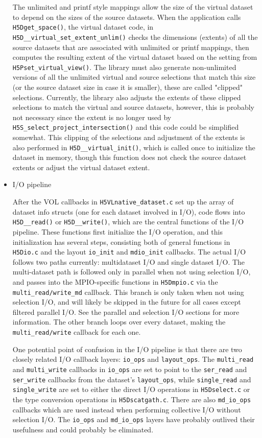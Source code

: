\begin{itemize}
The unlimited and printf style mappings allow the size of the virtual dataset to depend on the sizes of the source datasets. When the application calls \texttt{H5Dget\_space()}, the virtual dataset code, in \texttt{H5D\_\_virtual\_set\_extent\_unlim()} checks the dimensions (extents) of all the source datasets that are associated with unlimited or printf mappings, then computes the resulting extent of the virtual dataset based on the setting from \texttt{H5Pset\_virtual\_view()}. The library must also generate non-unlimited versions of all the unlimited virtual and source selections that match this size (or the source dataset size in case it is smaller), these are called "clipped" selections. Currently, the library also adjusts the extents of these clipped selections to match the virtual and source datasets, however, this is probably not necessary since the extent is no longer used by \texttt{H5S\_select\_project\_intersection()} and this code could be simplified somewhat. This clipping of the selections and adjustment of the extents is also performed in \texttt{H5D\_\_virtual\_init()}, which is called once to initialize the dataset in memory, though this function does not check the source dataset extents or adjust the virtual dataset extent.

    \item I/O pipeline

After the VOL callbacks in \texttt{H5VLnative\_dataset.c} set up the array of dataset info structs (one for each dataset involved in I/O), code flows into \texttt{H5D\_\_read()} or \texttt{H5D\_\_write()}, which are the central functions of the I/O pipeline. These functions first initialize the I/O operation, and this initialization has several steps, consisting both of general functions in \texttt{H5Dio.c} and the layout \texttt{io\_init} and \texttt{mdio\_init} callbacks. The actual I/O follows two paths currently: multidataset I/O and single dataset I/O. The multi-dataset path is followed only in parallel when not using selection I/O, and passes into the MPIO-specific functions in \texttt{H5Dmpio.c} via the \texttt{multi\_read/write\_md} callback. This branch is only taken when not using selection I/O, and will likely be skipped in the future for all cases except filtered parallel I/O. See the parallel and selection I/O sections for more information. The other branch loops over every dataset, making the \texttt{multi\_read/write} callback for each one.

One potential point of confusion in the I/O pipeline is that there are two closely related I/O callback layers: \texttt{io\_ops} and \texttt{layout\_ops}. The \texttt{multi\_read} and \texttt{multi\_write} callbacks in \texttt{io\_ops} are set to point to the \texttt{ser\_read} and \texttt{ser\_write} callbacks from the dataset's \texttt{layout\_ops}, while \texttt{single\_read} and \texttt{single\_write} are set to either the direct I/O operations in \texttt{H5Dselect.c} or the type conversion operations in \texttt{H5Dscatgath.c}. There are also \texttt{md\_io\_ops} callbacks which are used instead when performing collective I/O without selection I/O. The \texttt{io\_ops} and \texttt{md\_io\_ops} layers have probably outlived their usefulness and could probably be eliminated.


\end{itemize}
